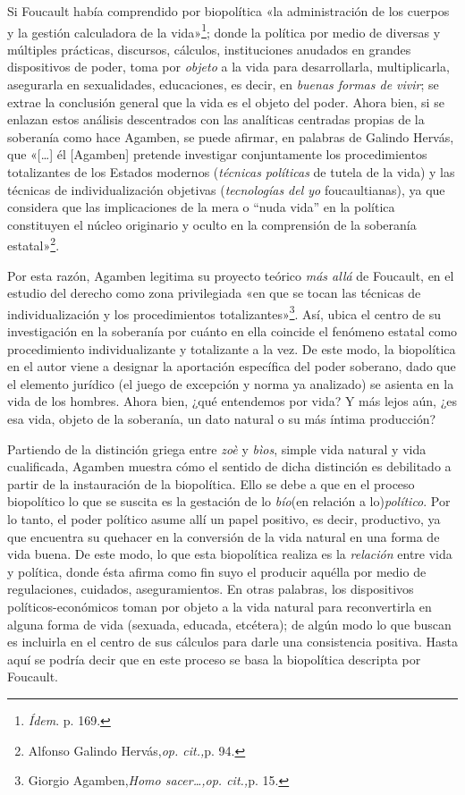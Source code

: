 Si Foucault había comprendido por biopolítica «la administración de los cuerpos y la gestión calculadora de la vida»\footnote{\emph{Ídem}. p. 169.}; donde la política por medio de diversas y múltiples prácticas, discursos, cálculos, instituciones anudados en grandes dispositivos de poder, toma por \emph{objeto} a la vida para desarrollarla, multiplicarla, asegurarla en sexualidades, educaciones, es decir, en \emph{buenas formas de vivir}; se extrae la conclusión general que la vida es el objeto del poder. Ahora bien, si se enlazan estos análisis descentrados con las analíticas centradas propias de la soberanía como hace Agamben, se puede afirmar, en palabras de Galindo Hervás, que «{[}\ldots{]} él {[}Agamben{]} pretende investigar conjuntamente los procedimientos totalizantes de los Estados modernos (\emph{técnicas políticas} de tutela de la vida) y las técnicas de individualización objetivas (\emph{tecnologías del yo} foucaultianas), ya que considera que las implicaciones de la mera o ``nuda vida'' en la política constituyen el núcleo originario y oculto en la comprensión de la soberanía estatal»\footnote{Alfonso Galindo Hervás,\emph{op. cit.,}p. 94.}.

Por esta razón, Agamben legitima su proyecto teórico \emph{más allá} de Foucault, en el estudio del derecho como zona privilegiada «en que se tocan las técnicas de individualización y los procedimientos totalizantes»\footnote{Giorgio Agamben,\emph{Homo sacer\ldots,op. cit.,}p. 15.}. Así, ubica el centro de su investigación en la soberanía por cuánto en ella coincide el fenómeno estatal como procedimiento individualizante y totalizante a la vez. De este modo, la biopolítica en el autor viene a designar la aportación específica del poder soberano, dado que el elemento jurídico (el juego de excepción y norma ya analizado) se asienta en la vida de los hombres. Ahora bien, ¿qué entendemos por vida? Y más lejos aún, ¿es esa vida, objeto de la soberanía, un dato natural o su más íntima producción?

Partiendo de la distinción griega entre \emph{zoè} y \emph{bìos}, simple vida natural y vida cualificada, Agamben muestra cómo el sentido de dicha distinción es debilitado a partir de la instauración de la biopolítica. Ello se debe a que en el proceso biopolítico lo que se suscita es la gestación de lo \emph{bío}(en relación a lo)\emph{político}. Por lo tanto, el poder político asume allí un papel positivo, es decir, productivo, ya que encuentra su quehacer en la conversión de la vida natural en una forma de vida buena. De este modo, lo que esta biopolítica realiza es la \emph{relación} entre vida y política, donde ésta afirma como fin suyo el producir aquélla por medio de regulaciones, cuidados, aseguramientos. En otras palabras, los dispositivos políticos-económicos toman por objeto a la vida natural para reconvertirla en alguna forma de vida (sexuada, educada, etcétera); de algún modo lo que buscan es incluirla en el centro de sus cálculos para darle una consistencia positiva. Hasta aquí se podría decir que en este proceso se basa la biopolítica descripta por Foucault.

